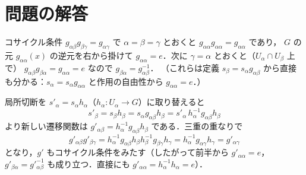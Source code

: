 \section*{問題の解答}

コサイクル条件 $g_{\alpha\beta}g_{\beta\gamma}=g_{\alpha\gamma}$ で $\alpha=\beta=\gamma$ とおくと $g_{\alpha\alpha}g_{\alpha\alpha}=g_{\alpha\alpha}$ であり，
$G$ の元 $g_{\alpha\alpha}(x)$ の逆元を右から掛けて $g_{\alpha\alpha}=e$．次に $\gamma=\alpha$ とおくと（$U_\alpha\cap U_\beta$ 上で）
$g_{\alpha\beta}g_{\beta\alpha}=g_{\alpha\alpha}=e$ なので $g_{\beta\alpha}=g_{\alpha\beta}^{-1}$．
（これらは定義 $s_\beta=s_\alpha g_{\alpha\beta}$ から直接も分かる：$s_\alpha=s_\alpha g_{\alpha\alpha}$ と作用の自由性から $g_{\alpha\alpha}=e$．）

局所切断を $s'_\alpha=s_\alpha h_\alpha$（$h_\alpha:U_\alpha\to G$）に取り替えると
\begin{equation*}
  s'_\beta = s_\beta h_\beta = s_\alpha g_{\alpha\beta}h_\beta = s'_\alpha\,h_\alpha^{-1}g_{\alpha\beta}h_\beta
\end{equation*}
より新しい遷移関数は $g'_{\alpha\beta}=h_\alpha^{-1}g_{\alpha\beta}h_\beta$ である．三重の重なりで
\begin{equation*}
  g'_{\alpha\beta}g'_{\beta\gamma} = h_\alpha^{-1}g_{\alpha\beta}h_\beta h_\beta^{-1}g_{\beta\gamma}h_\gamma = h_\alpha^{-1}g_{\alpha\gamma}h_\gamma = g'_{\alpha\gamma}
\end{equation*}
となり，$g'$ もコサイクル条件をみたす（したがって前半から $g'_{\alpha\alpha}=e$，$g'_{\beta\alpha}=g'^{-1}_{\alpha\beta}$ も成り立つ．直接にも $g'_{\alpha\alpha}=h_\alpha^{-1}h_\alpha=e$）．

